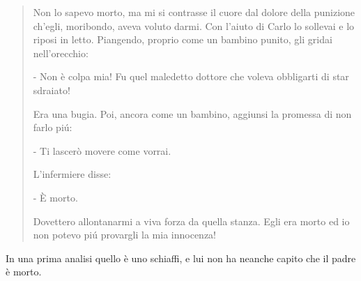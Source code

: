 \documentclass[a4paper, twoside, titlepage]{book}
\begin{document}
\begin{quotation}
Non lo sapevo morto, ma mi si contrasse il cuore dal dolore della punizione ch’egli, moribondo, aveva voluto darmi. Con l’aiuto di Carlo lo sollevai e lo riposi in letto. Piangendo, proprio come un bambino punito, gli gridai nell’orecchio:

- Non è colpa mia! Fu quel maledetto dottore che voleva obbligarti di star sdraiato!

Era una bugia. Poi, ancora come un bambino, aggiunsi la promessa di non farlo piú:

- Ti lascerò movere come vorrai.

L’infermiere disse:

- È morto.

Dovettero allontanarmi a viva forza da quella stanza. Egli era morto ed io non potevo piú provargli la mia innocenza!
\end{quotation}

In una prima analisi quello è uno schiaffi, e lui non ha neanche capito che il padre è morto.
\end{document}
